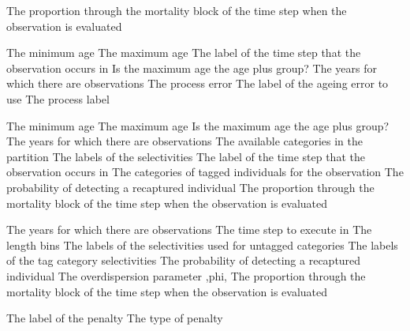  {The proportion through the mortality block of the time step when the observation is evaluated}
\par\textbf{}\par
{} {The minimum age}
 {The maximum age}
 {The label of the time step that the observation occurs in}
 {Is the maximum age the age plus group?}
 {The years for which there are observations}
 {The process error}
 {The label of the ageing error to use}
 {The process label}
\par\textbf{}\par
{} {The minimum age}
 {The maximum age}
 {Is the maximum age the age plus group?}
 {The years for which there are observations}
 {The available categories in the partition}
 {The labels of the selectivities}
 {The label of the time step that the observation occurs in}
 {The categories of tagged individuals for the observation}
 {The probability of detecting a recaptured individual}
 {The proportion through the mortality block of the time step when the observation is evaluated}
\par\textbf{}\par
{} {The years for which there are observations}
 {The time step to execute in}
 {The length bins}
 {The labels of the selectivities used for untagged categories}
 {The labels of the tag category selectivities}
 {The probability of detecting a recaptured individual}
 {The overdispersion parameter ,phi,}
 {The proportion through the mortality block of the time step when the observation is evaluated}
\par\par
{} {The label of the penalty}
 {The type of penalty}
\par\par

